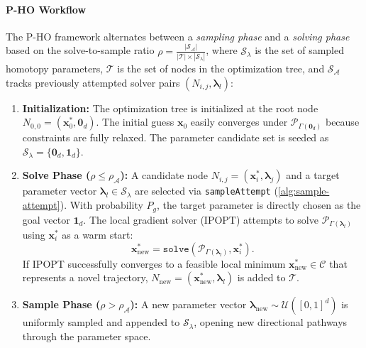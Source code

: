 \paragraph{P-HO Workflow}
The \ac{P-HO} framework alternates between a \emph{sampling phase} and a \emph{solving phase} based on the solve-to-sample ratio $\rho = \frac{|\mathcal{S}_{\mathcal{A}}|}{|\mathcal{T}| \times |\mathcal{S}_{\lambda}|}$, where $\mathcal{S}_{\lambda}$ is the set of sampled homotopy parameters, $\mathcal{T}$ is the set of nodes in the optimization tree, and $\mathcal{S}_{\mathcal{A}}$ tracks previously attempted solver pairs $(N_{i,j}, \boldsymbol{\lambda}_l)$:
\begin{enumerate}
    \item \textbf{Initialization:} The optimization tree is initialized at the root node $N_{0,0} = (\mathbf{x}_0^*, \mathbf{0}_d)$. The initial guess $\mathbf{x}_0$ easily converges under $\mathcal{P}_{\Gamma(\mathbf{0}_d)}$ because constraints are fully relaxed. The parameter candidate set is seeded as $\mathcal{S}_{\lambda} = \{\mathbf{0}_d, \mathbf{1}_d\}$.
    \item \textbf{Solve Phase ($\rho \le \rho_{\mathcal{A}}$):} A candidate node $N_{i,j} = (\mathbf{x}_i^*, \boldsymbol{\lambda}_j)$ and a target parameter vector $\boldsymbol{\lambda}_l \in \mathcal{S}_{\lambda}$ are selected via \texttt{sampleAttempt} (\cref{alg:sample-attempt}). With probability $P_g$, the target parameter is directly chosen as the goal vector $\mathbf{1}_d$. The local gradient solver (\ac{IPOPT}) attempts to solve $\mathcal{P}_{\Gamma(\boldsymbol{\lambda}_l)}$ using $\mathbf{x}_i^*$ as a warm start:
    \begin{equation}
        \mathbf{x}_{\text{new}}^* = \texttt{solve}\left(\mathcal{P}_{\Gamma(\boldsymbol{\lambda}_l)}, \mathbf{x}_i^*\right).
    \end{equation}
    If \ac{IPOPT} successfully converges to a feasible local minimum $\mathbf{x}_{\text{new}}^* \in \mathcal{C}$ that represents a novel trajectory, $N_{\text{new}} = (\mathbf{x}_{\text{new}}^*, \boldsymbol{\lambda}_l)$ is added to $\mathcal{T}$.
    \item \textbf{Sample Phase ($\rho > \rho_{\mathcal{A}}$):} A new parameter vector $\boldsymbol{\lambda}_{\text{new}} \sim \mathcal{U}([0,1]^d)$ is uniformly sampled and appended to $\mathcal{S}_{\lambda}$, opening new directional pathways through the parameter space.
\end{enumerate}

